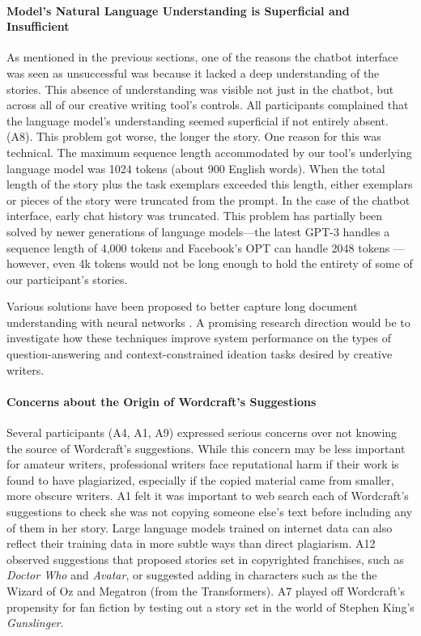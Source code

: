 \paragraph{Model's Natural Language Understanding is Superficial and Insufficient}
\label{section:nlu}
As mentioned in the previous sections, one of the reasons the chatbot interface was seen as unsuccessful was because it lacked a deep understanding of the stories.
This absence of understanding was visible not just in the chatbot, but across all of our creative writing tool's controls.
All participants complained that the language model's understanding seemed superficial if not entirely absent.
 (A8).
This problem got worse, the longer the story.
One reason for this was technical.
The maximum sequence length accommodated by our tool's underlying language model was 1024 tokens (about 900 English words).
When the total length of the story plus the task exemplars exceeded this length, either exemplars or pieces of the story were truncated from the prompt.
In the case of the chatbot interface, early chat history was truncated.
This problem has partially been solved by newer generations of language models---the latest GPT-3 handles a sequence length of 4,000 tokens and Facebook's OPT can handle 2048 tokens \citep{zhang2022opt}---however, even 4k tokens would not be long enough to hold the entirety of some of our participant's stories.

Various solutions have been proposed to better capture long document understanding with neural networks \citep{hutchins2022block,dai2019transformer,beltagy2020longformer,hawthorne2022general}.
A promising research direction would be to investigate how these techniques improve system performance on the types of question-answering and context-constrained ideation tasks desired by creative writers.


\paragraph{Concerns about the Origin of Wordcraft's Suggestions}
Several participants (A4, A1, A9) expressed serious concerns over not knowing the source of Wordcraft's suggestions.
While this concern may be less important for amateur writers, professional writers face reputational harm if their work is found to have plagiarized, especially if the copied material came from smaller, more obscure writers.
A1 felt it was important to web search each of Wordcraft's suggestions to check she was not copying someone else’s text before including any of them in her story.
Large language models trained on internet data can also reflect their training data in more subtle ways than direct plagiarism.
A12 observed suggestions that proposed stories set in copyrighted franchises, such as \textit{Doctor Who} and \textit{Avatar}, or suggested adding in characters such as the the Wizard of Oz and Megatron (from the Transformers).
A7 played off Wordcraft's propensity for fan fiction by testing out a story set in the world of Stephen King's \textit{Gunslinger}.

